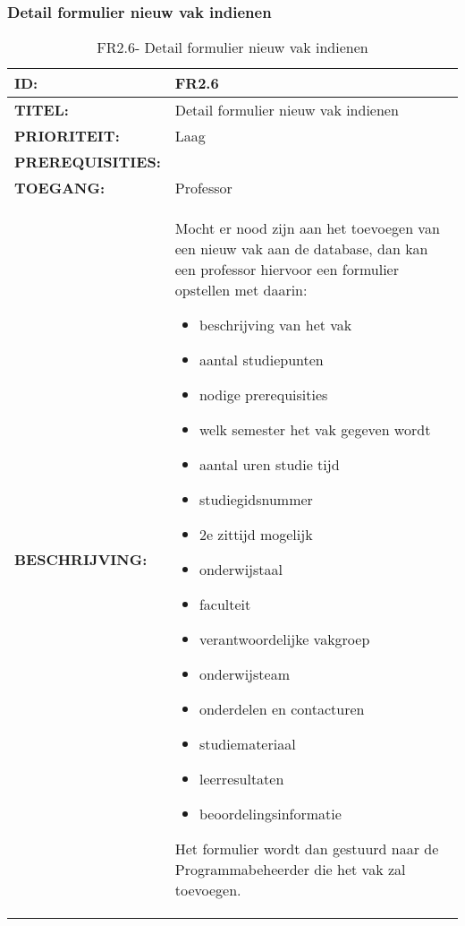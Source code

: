 \subsubsection{Detail formulier nieuw vak indienen} 
\noindent\begin{table}[H]
            \begin{tabular}{l | p{10cm}} 
                \textbf{ID:} & FR2.6 \\ \hline
                \textbf{TITEL:} & Detail formulier nieuw vak indienen\\ \hline
                \textbf{PRIORITEIT:} &  Laag \\ \hline
                \textbf{PREREQUISITIES:} & \\ \hline
                \textbf{TOEGANG:} & Professor \\ \hline
                \textbf{BESCHRIJVING:} & Mocht er nood zijn aan het toevoegen van een nieuw vak aan de database, dan kan een professor hiervoor een formulier opstellen met daarin:
        \begin{itemize}\itemsep1pt \parskip0pt \parsep0pt
                                        \item beschrijving van het vak
                                        \item aantal studiepunten
                                        \item nodige prerequisities
                                        \item welk semester het vak gegeven wordt
                                        \item aantal uren studie tijd
                                        \item studiegidsnummer
                                        \item 2e zittijd mogelijk
                                        \item onderwijstaal
                                        \item faculteit
                                        \item verantwoordelijke vakgroep
                                        \item onderwijsteam
                                        \item onderdelen en contacturen
                                        \item studiemateriaal
                                        \item leerresultaten
                                        \item beoordelingsinformatie
                                        \end{itemize}
                                        Het formulier wordt dan gestuurd naar de Programmabeheerder die het vak zal toevoegen. 
            \end{tabular}\\
            \caption{FR2.6- Detail formulier nieuw vak indienen}
            \label{tab:FR2.6 - Detail formulier nieuw vak indienen}
        \end{table}
        
